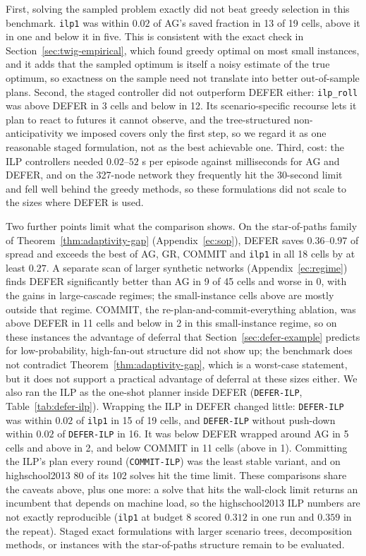 \documentclass[ASNA,number]{USG}
\begin{document}
First, solving the sampled problem exactly did not beat greedy selection in
this benchmark. \texttt{ilp1} was within $0.02$ of AG's saved fraction in 13
of 19 cells, above it in one and below it in five. This is consistent with the
exact check in Section~\ref{sec:twig-empirical}, which found greedy optimal on
most small instances, and it adds that the sampled optimum is itself a noisy
estimate of the true optimum, so exactness on the sample need not translate
into better out-of-sample plans. Second, the staged controller did not
outperform DEFER either: \texttt{ilp\_roll} was above DEFER in 3 cells and
below in 12. Its scenario-specific recourse lets it plan to react to futures it
cannot observe, and the tree-structured non-anticipativity we imposed covers
only the first step, so we regard it as one reasonable staged formulation, not
as the best achievable one. Third, cost: the ILP controllers needed
$0.02$--$52$ s per episode against milliseconds for AG and DEFER, and on the
327-node network they frequently hit the 30-second limit and fell well behind
the greedy methods, so these formulations did not scale to the sizes where
DEFER is used.

Two further points limit what the comparison shows. On the star-of-paths family
of Theorem~\ref{thm:adaptivity-gap} (Appendix~\ref{ec:sop}), DEFER
saves $0.36$--$0.97$ of spread and exceeds the best of AG, GR, COMMIT and
\texttt{ilp1} in all 18 cells by at least $0.27$. A separate scan of larger
synthetic networks (Appendix~\ref{ec:regime}) finds DEFER significantly
better than AG in 9 of 45 cells and worse in 0, with the gains in large-cascade regimes; the
small-instance cells above are mostly outside that regime. COMMIT, the
re-plan-and-commit-everything ablation, was above DEFER in 11 cells and below
in 2 in this small-instance regime, so on these instances the advantage of
deferral that Section~\ref{sec:defer-example} predicts for low-probability,
high-fan-out structure did not show up; the benchmark does not contradict
Theorem~\ref{thm:adaptivity-gap}, which is a worst-case statement, but it
does not support a practical advantage of deferral at these sizes either. We
also ran the ILP as the one-shot planner inside DEFER
(\texttt{DEFER-ILP}, Table~\ref{tab:defer-ilp}). Wrapping the
ILP in DEFER changed little: \texttt{DEFER-ILP} was within $0.02$ of
\texttt{ilp1} in 15 of 19 cells, and \texttt{DEFER-ILP} without push-down
within $0.02$ of \texttt{DEFER-ILP} in 16. It was below DEFER wrapped around AG in 5
cells and above in 2, and below COMMIT in 11 cells (above in 1). Committing the
ILP's plan every round (\texttt{COMMIT-ILP}) was the least stable variant,
and on highschool2013 80 of its 102 solves hit the time limit. These
comparisons share the caveats above, plus one more: a solve that hits the
wall-clock limit returns an incumbent that depends on machine load, so the
highschool2013 ILP numbers are not exactly reproducible (\texttt{ilp1} at
budget $8$ scored $0.312$ in one run and $0.359$ in the repeat). Staged exact formulations with larger scenario trees, decomposition methods, or
instances with the star-of-paths structure remain to be evaluated.
\end{document}
